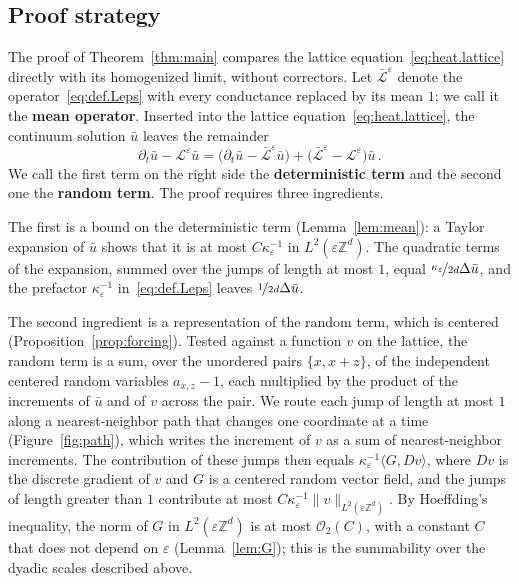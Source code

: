 \documentclass[11pt]{amsart}
\numberwithin{equation}{section}
\newcommand{\Z}{\mathbb{Z}}
\newcommand{\cO}{\mathcal{O}}
\newcommand{\eps}{\varepsilon}
\newcommand{\Leps}{\mathcal{L}^\varepsilon}
\newcommand{\Lbar}{\bar{\mathcal{L}}^\varepsilon}
\newcommand{\nf}{\nicefrac}
\begin{document}
\subsection{Proof strategy}

The proof of Theorem~\ref{thm:main} compares the lattice equation~\eqref{eq:heat.lattice} directly with its homogenized limit, without correctors.
Let $\Lbar$ denote the operator~\eqref{eq:def.Leps} with every conductance replaced by its mean $1$; we call it the \textbf{mean operator}.
Inserted into the lattice equation~\eqref{eq:heat.lattice}, the continuum solution $\bar u$ leaves the remainder
\begin{equation} \label{eq:splitting}
    \partial_t \bar u - \Leps \bar u = \bigl( \partial_t \bar u - \Lbar \bar u \bigr) + \bigl( \Lbar - \Leps \bigr) \bar u\,.
\end{equation}
We call the first term on the right side the \textbf{deterministic term} and the second one the \textbf{random term}.
The proof requires three ingredients.

The first is a bound on the deterministic term (Lemma~\ref{lem:mean}): a Taylor expansion of $\bar u$ shows that it is at most $C \kappa_\eps^{-1}$ in $L^2(\eps \Z^d)$.
The quadratic terms of the expansion, summed over the jumps of length at most $1$, equal $\nf{\kappa_\eps}{2d} \Delta \bar u$, and the prefactor $\kappa_\eps^{-1}$ in~\eqref{eq:def.Leps} leaves $\nf{1}{2d} \Delta \bar u$.

The second ingredient is a representation of the random term, which is centered (Proposition~\ref{prop:forcing}).
Tested against a function $v$ on the lattice, the random term is a sum, over the unordered pairs $\{x, x+z\}$, of the independent centered random variables $a_{x,z} - 1$, each multiplied by the product of the increments of $\bar u$ and of $v$ across the pair.
We route each jump of length at most $1$ along a nearest-neighbor path that changes one coordinate at a time (Figure~\ref{fig:path}), which writes the increment of $v$ as a sum of nearest-neighbor increments.
The contribution of these jumps then equals $\kappa_\eps^{-1} \langle G, D v \rangle$, where $D v$ is the discrete gradient of $v$ and $G$ is a centered random vector field, and the jumps of length greater than $1$ contribute at most $C \kappa_\eps^{-1} \|v\|_{L^2(\eps \Z^d)}$.
By Hoeffding's inequality, the norm of $G$ in $L^2(\eps \Z^d)$ is at most $\cO_2(C)$, with a constant $C$ that does not depend on $\eps$ (Lemma~\ref{lem:G}); this is the summability over the dyadic scales described above.
\end{document}
